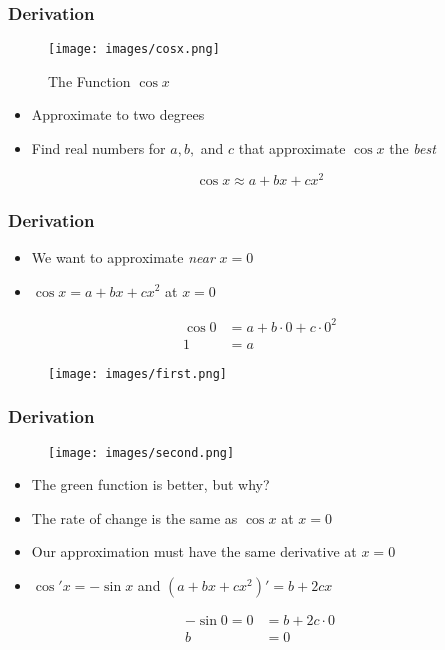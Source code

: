 \documentclass{beamer}
\begin{document}
\begin{frame}
  \frametitle{Derivation}
  \begin{figure}[ht]
    \centering
    \caption{The Function \( \cos x \)}
    \texttt{[image: images/cosx.png]}
  \end{figure}
  \begin{itemize}
    \item Approximate to two degrees
    \item Find real numbers for \( a, b, \) and \( c \) that approximate \( \cos x \) the \textit{best}
  \end{itemize}
  \begin{equation*}
    \cos x \approx a + bx + cx^2
  \end{equation*}
\end{frame}

\begin{frame}
  \frametitle{Derivation}
  \begin{itemize}
    \item We want to approximate \textit{near} \( x = 0 \)
    \item \( \cos x = a + bx + cx^2 \) at \( x = 0 \)
  \end{itemize}
  \begin{align*}
    \cos 0 &= a + b \cdot 0 + c \cdot 0^2 \\
    1 &= a
  \end{align*}
  \begin{figure}[ht]
    \centering
    \texttt{[image: images/first.png]}
  \end{figure}
\end{frame}

\begin{frame}
  \frametitle{Derivation}
  \begin{figure}[ht]
    \centering
    \texttt{[image: images/second.png]}
  \end{figure}
  \begin{itemize}
    \item The green function is better, but why?
    \item The rate of change is the same as \( \cos x \) at \( x = 0 \)
    \item Our approximation must have the same derivative at \( x = 0 \)
    \item \( \cos' x = -\sin x \) and \( (a + bx + cx^2)' = b + 2cx \)
  \end{itemize}
  \begin{align*}
    -\sin 0 = 0 &= b + 2c \cdot 0 \\
    b &= 0
  \end{align*}
\end{frame}
\end{document}
